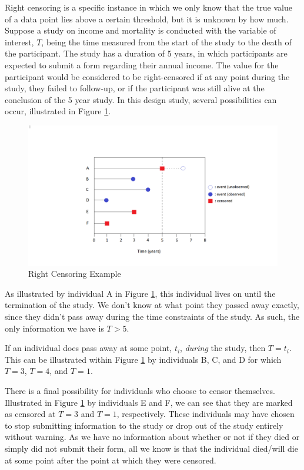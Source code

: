 \documentclass[12pt, twoside]{amherstthesis}
\begin{document}
Right censoring is a specific instance in which we only know that the true value of a data point lies above a certain threshold, but it is unknown by how much. Suppose a study on income and mortality is conducted with the variable of interest, \(T\), being the time measured from the start of the study to the death of the participant. The study has a duration of 5 years, in which participants are expected to submit a form regarding their annual income. The value for the participant would be considered to be right-censored if at any point during the study, they failed to follow-up, or if the participant was still alive at the conclusion of the 5 year study. In this design study, several possibilities can occur, illustrated in Figure \ref{fig:rightcensoringexample}.
\begin{figure}

{\centering \includegraphics[width=1\linewidth]{figures/right_censoring_example} 

}

\caption{Right Censoring Example}\label{fig:rightcensoringexample}
\end{figure}
As illustrated by individual A in Figure \ref{fig:rightcensoringexample}, this individual lives on until the termination of the study. We don't know at what point they passed away exactly, since they didn't pass away during the time constraints of the study. As such, the only information we have is \(T > 5\).

If an individual does pass away at some point, \(t_i\), \emph{during} the study, then \(T = t_i\). This can be illustrated within Figure \ref{fig:rightcensoringexample} by individuals B, C, and D for which \(T = 3\), \(T = 4\), and \(T = 1\).

There is a final possibility for individuals who choose to censor themselves. Illustrated in Figure \ref{fig:rightcensoringexample} by individuals E and F, we can see that they are marked as censored at \(T = 3\) and \(T = 1\), respectively. These individuals may have chosen to stop submitting information to the study or drop out of the study entirely without warning. As we have no information about whether or not if they died or simply did not submit their form, all we know is that the individual died/will die at some point after the point at which they were censored.
\end{document}
